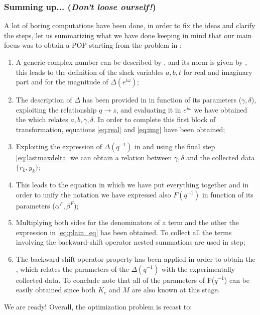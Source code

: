 \subsubsection{Summing up... (\textit{Don't loose ourself!})}
A lot of boring computations have been done, in order to fix the ideas and clarify the steps, let us summarizing what we have done keeping in mind that our main focus was to obtain a POP starting from the problem in :
\begin{enumerate}
    \item A generic complex number can be described by , and its norm  is given by , this leads to the definition of the slack variables $a,b,t$ for real and imaginary part and for the magnitude of $\Delta(e^{i\omega})$;
    \item The description of $\Delta$ has been provided in  in function of its parameters ($\gamma,\delta$), exploiting the relationship $q\to{z}$, and evaluating it in $e^{i\omega}$ we have obtained the  which relates $a,b,\gamma,\delta$. In order to complete this first block of transformation, equations \cref{eq:real} and \cref{eq:img} have been obtained; 
    \item Exploiting the expression of $\Delta(q^{-1})$ in  and using the final step \cref{eq:lastmaxdelta} we can obtain a relation between $\gamma,\delta$ and the collected data $\{r_k,\tilde{y}_k\}$; 
    \item This leads to the equation  in which we have put everything together and in order to unify the notation we have expressed also $F(q^{-1})$ in function of its parameters ($\alpha^F, \beta^F$); 
    \item Multiplying both sides for the denominators of a term and the other the expression in \cref{eq:plain_eq} has been obtained. To collect all the terms involving the backward-shift operator nested summations are used in  step; 
    \item The backward-shift operator property has been applied in order to obtain the , which relates the parameters of the $\Delta(q^{-1})$ with the experimentally collected data. To conclude note that all of the parameters of F($q^{-1}$) can be easily obtained since both $K_c$ and $M$ are also known at this stage.
 \end{enumerate}

We are ready! Overall, the optimization problem is recast to:

